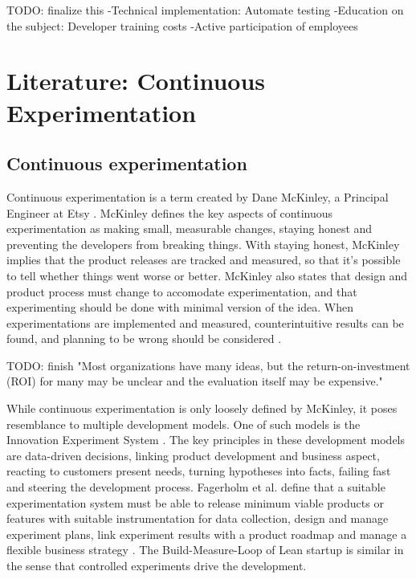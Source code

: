 \documentclass[english]{tktltiki2}
\theoremstyle{definition}
\theoremstyle{remark}
\begin{document}
TODO: finalize this
-Technical implementation: Automate testing
-Education on the subject: Developer training costs
-Active participation of employees

\section{Literature: Continuous Experimentation}

\subsection{Continuous experimentation}

Continuous experimentation is a term created by Dane McKinley, a Principal Engineer at Etsy \cite{mcfunley}. McKinley defines the key aspects of continuous experimentation as making small, measurable changes, staying honest and preventing the developers from breaking things. With staying honest, McKinley implies that the product releases are tracked and measured, so that it's possible to tell whether things went worse or better. McKinley also states that design and product process must change to accomodate experimentation, and that experimenting should be done with minimal version of the idea. When experimentations are implemented and measured, counterintuitive results can be found, and planning to be wrong should be considered \cite{mcfunley}. 

TODO: finish
"Most organizations have many ideas, but the return-on-investment (ROI) for many may be unclear and the evaluation itself may be expensive." \cite{kohavi2007practical}

While continuous experimentation is only loosely defined by McKinley, it poses resemblance to multiple development models. One of such models is the Innovation Experiment System \cite{bosch2012building}. The key principles in these development models are data-driven decisions, linking product development and business aspect, reacting to customers present needs, turning hypotheses into facts, failing fast and steering the development process. Fagerholm et al. define that a suitable experimentation system must be able to release minimum viable products or features with suitable instrumentation for data collection, design and manage experiment plans, link experiment results with a product roadmap and manage a flexible business strategy \cite{fagerholm2014building}. The Build-Measure-Loop of Lean startup is similar in the sense that controlled experiments drive the development.
\end{document}
